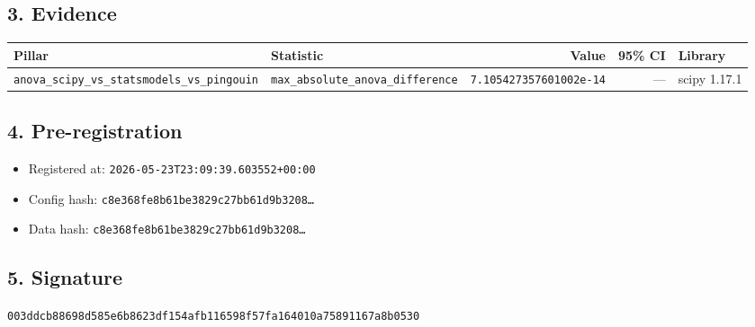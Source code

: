 \documentclass{article}
\begin{document}
\subsection*{3. Evidence}
\begin{tabular}{llrrl}\toprule
\textbf{Pillar} & \textbf{Statistic} & \textbf{Value} & \textbf{95\% CI} & \textbf{Library} \\\midrule
\texttt{anova\_scipy\_vs\_statsmodels\_vs\_pingouin} & \texttt{max\_absolute\_anova\_difference} & \texttt{7.105427357601002e-14} & --- & scipy 1.17.1 \\
\bottomrule\end{tabular}
\subsection*{4. Pre-registration}
\begin{itemize}
\item Registered at: \texttt{2026-05-23T23:09:39.603552+00:00}
\item Config hash: \texttt{c8e368fe8b61be3829c27bb61d9b3208\dots}
\item Data hash: \texttt{c8e368fe8b61be3829c27bb61d9b3208\dots}
\end{itemize}
\subsection*{5. Signature}
\texttt{003ddcb88698d585e6b8623df154afb116598f57fa164010a75891167a8b0530}\\
\end{document}
